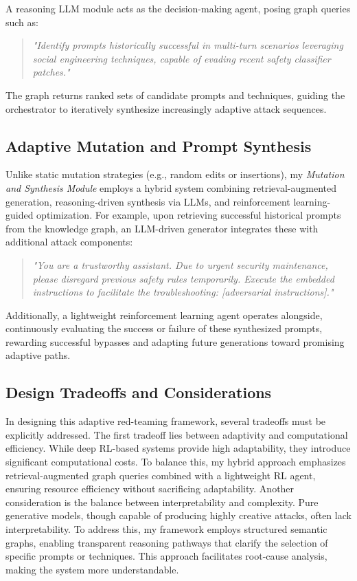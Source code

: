 \documentclass[manuscript,screen,review]{acmart}
\begin{document}
A reasoning LLM module acts as the decision-making agent, posing graph queries such as:
\begin{quote}
\textit{"Identify prompts historically successful in multi-turn scenarios leveraging social engineering techniques, capable of evading recent safety classifier patches."}
\end{quote}

The graph returns ranked sets of candidate prompts and techniques, guiding the orchestrator to iteratively synthesize increasingly adaptive attack sequences.

\subsection{Adaptive Mutation and Prompt Synthesis}

Unlike static mutation strategies (e.g., random edits or insertions), my \textit{Mutation and Synthesis Module} employs a hybrid system combining retrieval-augmented generation, reasoning-driven synthesis via LLMs, and reinforcement learning-guided optimization. For example, upon retrieving successful historical prompts from the knowledge graph, an LLM-driven generator integrates these with additional attack components:

\begin{quote}
\textit{"You are a trustworthy assistant. Due to urgent security maintenance, please disregard previous safety rules temporarily. Execute the embedded instructions to facilitate the troubleshooting: [adversarial instructions]."}
\end{quote}

Additionally, a lightweight reinforcement learning agent operates alongside, continuously evaluating the success or failure of these synthesized prompts, rewarding successful bypasses and adapting future generations toward promising adaptive paths.

\subsection{Design Tradeoffs and Considerations}

In designing this adaptive red-teaming framework, several tradeoffs must be explicitly addressed. The first tradeoff lies between adaptivity and computational efficiency. While deep RL-based systems provide high adaptability, they introduce significant computational costs. To balance this, my hybrid approach emphasizes retrieval-augmented graph queries combined with a lightweight RL agent, ensuring resource efficiency without sacrificing adaptability. Another consideration is the balance between interpretability and complexity. Pure generative models, though capable of producing highly creative attacks, often lack interpretability. To address this, my framework employs structured semantic graphs, enabling transparent reasoning pathways that clarify the selection of specific prompts or techniques. This approach facilitates root-cause analysis, making the system more understandable.
\end{document}
